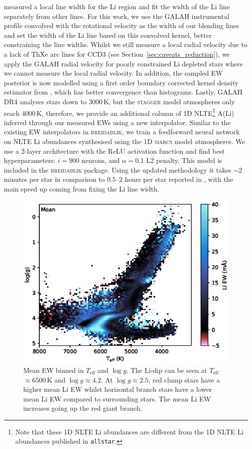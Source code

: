 \documentclass[
  journal=pasa,
  manuscript=research-paper, %
  year=2024,
  volume=37
]{cup-journal}
\newcommand{\Teff}{$T_\mathrm{eff}$\xspace}
\newcommand{\logg}{$\log g$\xspace}
\newcommand{\marcs}{\textsc{marcs}\xspace}
\newcommand{\breidablik}{\textsc{breidablik}\xspace}
\newcommand{\stagger}{\textsc{stagger}\xspace}
\begin{document}
\citet{Wang2024} measured a local line width for the Li region and fit the width of the Li line separately from other lines. For this work, we use the GALAH instrumental profile convolved with the rotational velocity as the width of our blending lines and set the width of the Li line based on this convolved kernel, better constraining the line widths. 
Whilst we still measure a local radial velocity due to a lack of ThXe arc lines for CCD3 (see Section~\ref{sec:caveats_reduction}), we apply the GALAH radial velocity for poorly constrained Li depleted stars where we cannot measure the local radial velocity. In addition, the sampled EW posterior is now modelled using a first order boundary corrected kernel density estimator from \citet{Lewis2019}, which has better convergence than histograms. Lastly, GALAH DR4 analyses stars down to 3000\,K, but the \stagger model atmospheres only reach 4000\,K, therefore, we provide an additional column of 1D NLTE\footnote{Note that these 1D NLTE Li abundances are different from the 1D NLTE Li abundances published in \texttt{allstar}.} A(Li) inferred through our measured EWs using a new interpolator. Similar to the existing EW interpolators in \breidablik \citep{Wang2021}, we train a feedforward neural network on NLTE Li abundances synthesised using the 1D \marcs model atmospheres. We use a 2-layer architecture with the ReLU activation function and find best hyperparameters: $i = 900$ neurons, and $\alpha = 0.1$ L2 penalty. This model is included in the \breidablik package.
Using the updated methodology it takes $\sim$2 minutes per star in comparison to $0.5$--$2$ hours per star reported in \citet{Wang2024}, with the main speed up coming from fixing the Li line width. 

\begin{figure}[ht]
\includegraphics[width=\columnwidth]{figures/mean_ew.eps}
\caption{
Mean EW binned in \Teff and \logg. The Li-dip can be seen at \Teff$\approx 6500$\,K and \logg$\approx 4.2$. At \logg$\approx 2.5$, red clump stars have a higher mean Li EW whilst horizontal branch stars have a lower mean Li EW compared to surrounding stars. The mean Li EW increases going up the red giant branch. 
}
\label{fig:mean_ew}
\end{figure}
\end{document}
